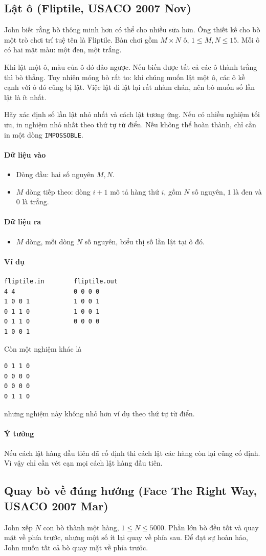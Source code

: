 \documentclass[11pt]{article}
\newcommand{\problem}[1]{\subsection{#1}}
\newcommand{\iosec}[1]{\paragraph{#1}}
\begin{document}
\problem{Lật ô (Fliptile, USACO 2007 Nov)}

John biết rằng bò thông minh hơn có thể cho nhiều sữa hơn. Ông thiết kế cho bò một trò chơi trí tuệ tên là Fliptile. Bàn chơi gồm \(M \times N\) ô, \(1 \le M,N \le 15\). Mỗi ô có hai mặt màu: một đen, một trắng.

Khi lật một ô, màu của ô đó đảo ngược. Nếu biến được tất cả các ô thành trắng thì bò thắng. Tuy nhiên móng bò rất to: khi chúng muốn lật một ô, các ô kề cạnh với ô đó cũng bị lật. Việc lật đi lật lại rất nhàm chán, nên bò muốn số lần lật là ít nhất.

Hãy xác định số lần lật nhỏ nhất và cách lật tương ứng. Nếu có nhiều nghiệm tối ưu, in nghiệm nhỏ nhất theo thứ tự từ điển. Nếu không thể hoàn thành, chỉ cần in một dòng \texttt{IMPOSSOBLE}.

\iosec{Dữ liệu vào}
\begin{itemize}
  \item Dòng đầu: hai số nguyên \(M,N\).
  \item \(M\) dòng tiếp theo: dòng \(i+1\) mô tả hàng thứ \(i\), gồm \(N\) số nguyên, \(1\) là đen và \(0\) là trắng.
\end{itemize}

\iosec{Dữ liệu ra}
\begin{itemize}
  \item \(M\) dòng, mỗi dòng \(N\) số nguyên, biểu thị số lần lật tại ô đó.
\end{itemize}

\iosec{Ví dụ}
\begin{verbatim}
fliptile.in        fliptile.out
4 4                0 0 0 0
1 0 0 1            1 0 0 1
0 1 1 0            1 0 0 1
0 1 1 0            0 0 0 0
1 0 0 1
\end{verbatim}

Còn một nghiệm khác là
\begin{verbatim}
0 1 1 0
0 0 0 0
0 0 0 0
0 1 1 0
\end{verbatim}
nhưng nghiệm này không nhỏ hơn ví dụ theo thứ tự từ điển.

\iosec{Ý tưởng}
Nếu cách lật hàng đầu tiên đã cố định thì cách lật các hàng còn lại cũng cố định. Vì vậy chỉ cần vét cạn mọi cách lật hàng đầu tiên.

\problem{Quay bò về đúng hướng (Face The Right Way, USACO 2007 Mar)}

John xếp \(N\) con bò thành một hàng, \(1 \le N \le 5000\). Phần lớn bò đều tốt và quay mặt về phía trước, nhưng một số ít lại quay về phía sau. Để đạt sự hoàn hảo, John muốn tất cả bò quay mặt về phía trước.
\end{document}
